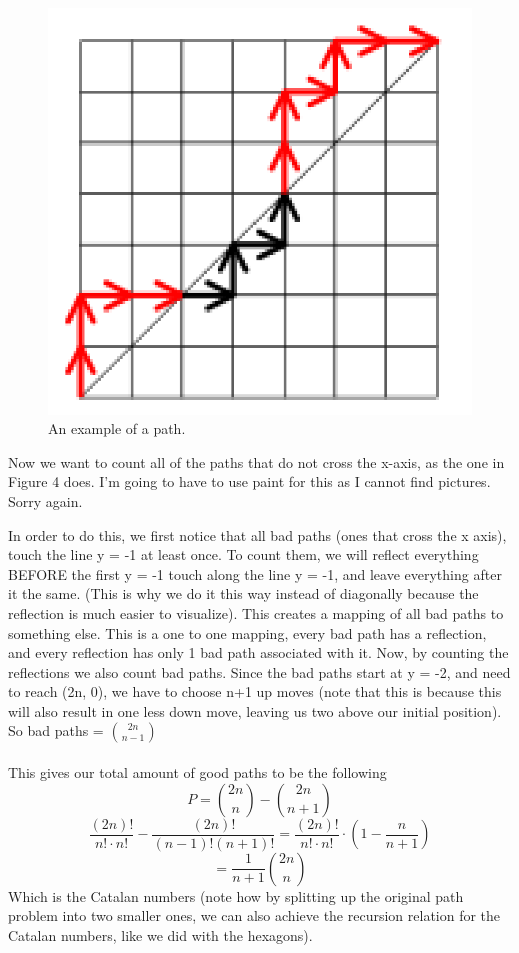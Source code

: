 \begin{figure}
    \includegraphics[width=\linewidth]{figures/Catalan_number_exceedance_example.png}
    \caption{An example of a path.}
     \label{fig:hex3}
\end{figure}

Now we want to count all of the paths that do not cross the x-axis, as the one in Figure 4 does. I'm going to have to use paint for this as I cannot find pictures. Sorry again. 

In order to do this, we first notice that all bad paths (ones that cross the x axis), touch the line y = -1 at least once. To count them, we will reflect everything BEFORE the first y = -1 touch along the line y = -1, and leave everything after it the same. (This is why we do it this way instead of diagonally because the reflection is much easier to visualize). This creates a mapping of all bad paths to something else. This is a one to one mapping, every bad path has a reflection, and every reflection has only 1 bad path associated with it. Now, by counting the reflections we also count bad paths. Since the bad paths start at y = -2, and need to reach (2n, 0), we have to choose n+1 up moves (note that this is because this will also result in one less down move, leaving us two above our initial position). \\So bad paths = $\binom{2n}{n-1}$
\\
\\
This gives our total amount of good paths to be the following $$P = \binom{2n}{n} - \binom{2n}{n+1}$$ $$\frac{(2n)!}{n!\cdot n!}-\frac{(2n)!}{(n-1)!(n+1)!} = \frac{(2n)!}{n!\cdot n!} \cdot(1-\frac{n}{n+1})$$
$$= \frac{1}{n+1}\binom{2n} n$$
Which is the Catalan numbers (note how by splitting up the original path problem into two smaller ones, we can also achieve the recursion relation for the Catalan numbers, like we did with the hexagons).


